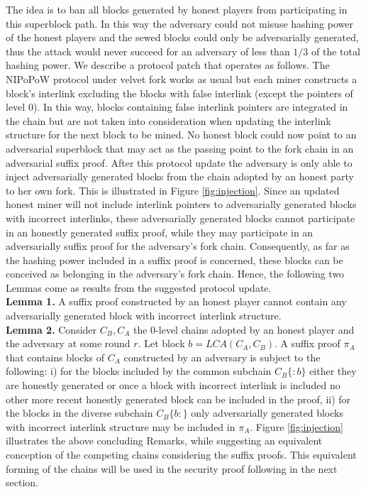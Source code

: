 \documentclass[11pt,a4paper]{article}
\begin{document}
The idea is to ban all blocks generated by honest players from participating in this superblock path. In this way the adversary could not misuse hashing power of the honest players and the sewed blocks could only be adversarially generated, thus the attack would never succeed for an adversary of less than $1/3$ of the total hashing power. 
We describe a protocol patch that operates as follows. The NIPoPoW protocol under velvet fork works as usual but each miner constructs a block's interlink excluding the blocks with false interlink (except the pointers of level 0). In this way, blocks containing false interlink pointers are integrated in the chain but are not taken into consideration when updating the interlink structure for the next block to be mined. No honest block could now point to an adversarial superblock that may act as the passing point to the fork chain in an adversarial suffix proof. 
After this protocol update the adversary is only able to inject adversarially generated blocks from the chain adopted by an honest party to her own fork. This is illustrated in Figure \ref{fig:injection}.
Since an updated honest miner will not include interlink pointers to adversarially generated blocks with incorrect interlinks, these adversarially generated blocks cannot participate in an honestly generated suffix proof, while they may participate in an adversarially suffix proof for the adversary's fork chain. Consequently, as far as the hashing power included in a suffix proof is concerned, these blocks can be conceived as belonging in the adversary's fork chain. 
Hence, the following two Lemmas come as results from the suggested protocol update.\\
\textbf{Lemma 1.} A suffix proof constructed by an honest player cannot contain any adversarially generated block with incorrect interlink structure.\\
\textbf{Lemma 2.} Consider $C_B, C_A$ the 0-level chains adopted by an honest player and the adversary at some round $r$. Let block $b = LCA(C_A, C_B)$. A suffix proof $\pi_A$ that contains blocks of $C_A$ constructed by an adversary is subject to the following: i) for the blocks included by the common subchain $C_B\{:b\}$ either they are honestly generated or once a block with incorrect interlink is included no other more recent honestly generated block can be included in the proof, ii) for the blocks in the diverse subchain $C_B\{b:\}$ only adversarially generated blocks with incorrect interlink structure may be included in $\pi_A$.
Figure \ref{fig:injection} illustrates the above concluding Remarks, while suggesting an equivalent conception of the competing chains considering the suffix proofs. This equivalent forming of the chains will be used in the security proof following in the next section. 
\end{document}
